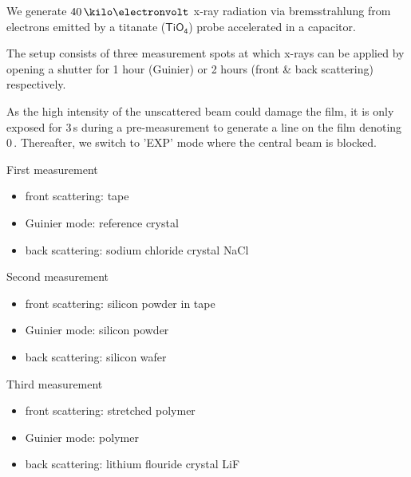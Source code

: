We generate $40\,\keV$ x-ray radiation via bremsstrahlung from electrons emitted by a titanate ($\mathsf{TiO_4}$) probe accelerated in a capacitor.

The setup consists of three measurement spots at which x-rays can be applied by opening a shutter for 1 hour (Guinier) or 2 hours (front \& back scattering) respectively.



As the high intensity of the unscattered beam could damage the film, it is only exposed for 3\,s during a pre-measurement to generate a line on the film denoting 0\,\degree. Thereafter, we switch to 'EXP' mode where the central beam is blocked.



First measurement
\begin{itemize}\itemsep-5pt
	\item front scattering: tape
	\item Guinier mode: reference crystal
	\item back scattering: sodium chloride crystal \textsf{NaCl}
\end{itemize}

Second measurement
\begin{itemize}\itemsep-5pt
	\item front scattering: silicon powder in tape
	\item Guinier mode: silicon powder
	\item back scattering: silicon wafer
\end{itemize}

Third measurement
\begin{itemize}\itemsep-5pt
	\item front scattering: stretched polymer
	\item Guinier mode: polymer
	\item back scattering: lithium flouride crystal \textsf{LiF}
\end{itemize}
